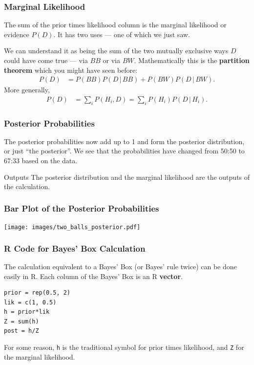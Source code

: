 \documentclass{beamer}
\newcommand{\given}{\,|\,}
\begin{document}
\begin{frame}
\frametitle{Marginal Likelihood}
The sum of the prior times likelihood column is the marginal likelihood
or evidence $P(D)$. It has two uses --- one of which we just saw.\\[0.5em]\pause

We can understand it as being the sum of the two mutually exclusive ways
$D$ could have come true --- via $BB$ or via $BW$. Mathematically this is
the {\bf partition theorem} which you might have seen before:
\begin{align}
P(D) &= P(BB)P(D \given BB) + P(BW)P(D \given BW).
\end{align}
\pause
More generally,
\begin{align}
P(D) &= \sum_i P(H_i, D) = \sum_i P(H_i)P(D \given H_i).
\end{align}

\end{frame}


\begin{frame}
\frametitle{Posterior Probabilities}
The posterior probabilities now add up to 1 and form the posterior distribution,
or just ``the posterior''. We see that the probabilities have changed from
50:50 to 67:33 based on the data.\pause

\begin{alertblock}{Outputs}
The posterior distribution and the marginal likelihood are the outputs of the
calculation.
\end{alertblock}

\end{frame}

\begin{frame}
\frametitle{Bar Plot of the Posterior Probabilities}

\centering
\texttt{[image: images/two\_balls\_posterior.pdf]}

\end{frame}


\begin{frame}[fragile]
\frametitle{R Code for Bayes' Box Calculation}
The calculation equivalent to a Bayes' Box (or Bayes' rule twice) can be
done easily in R. Each column of the Bayes' Box is an R {\bf vector}.\pause

\begin{verbatim}
prior = rep(0.5, 2)
lik = c(1, 0.5)
h = prior*lik
Z = sum(h)
post = h/Z
\end{verbatim}
\pause
For some reason, \texttt{h} is the traditional symbol for prior times
likelihood, and \texttt{Z} for the marginal likelihood.
\end{frame}
\end{document}
